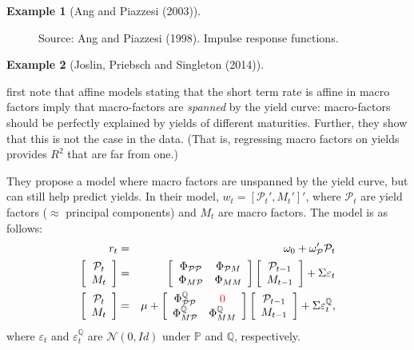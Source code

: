 \documentclass[
  12pt,
]{book}
\theoremstyle{definition}
\theoremstyle{definition}
\newtheorem{example}{Example}[chapter]
\theoremstyle{definition}
\theoremstyle{definition}
\theoremstyle{remark}
\begin{document}
\begin{example}[Ang and Piazzesi (2003)]
\begin{figure}
{}

\caption{Source: Ang and Piazzesi (1998). Impulse response functions.}\label{fig:figAngPiazzesi}
\end{figure}

\end{example}

\begin{example}[Joslin, Priebsch and Singleton (2014)]
\protect\hypertarget{exm:JPS}{}\label{exm:JPS}

\citet{Joslin_Priebsch_Singleton_2014} first note that affine models stating that the short term rate is affine in macro factors imply that macro-factors are \emph{spanned} by the yield curve: macro-factors should be perfectly explained by yields of different maturities. Further, they show that this is not the case in the data. (That is, regressing macro factors on yields provides \(R^2\) that are far from one.)

They propose a model where macro factors are unspanned by the yield curve, but can still help predict yields. In their model, \(w_t = [\mathcal{P}_t',M_t']'\), where \(\mathcal{P}_t\) are yield factors (\(\approx\) principal components) and \(M_t\) are macro factors. The model is as follows:
\begin{eqnarray*}
r_t &=& \omega_{0} + \omega_{\mathcal{P}}'\mathcal{P}_t \\
\left[\begin{array}{c}\mathcal{P}_t \\ M_t \end{array}\right]
&=&
\left[\begin{array}{cc}\Phi_{\mathcal{P}\mathcal{P}}&\Phi_{\mathcal{P}M} \\
\Phi_{M\mathcal{P}}&\Phi_{MM} \end{array}\right]
\left[\begin{array}{c}\mathcal{P}_{t-1} \\ M_{t-1} \end{array}\right] + \Sigma \varepsilon_t \\
\left[\begin{array}{c}\mathcal{P}_t \\ M_t \end{array}\right] &=& \mu +
\left[\begin{array}{cc}\Phi^{\mathbb{Q}}_{\mathcal{P}\mathcal{P}}&{\color{red}0} \\
\Phi^{\mathbb{Q}}_{M\mathcal{P}}&\Phi^{\mathbb{Q}}_{MM} \end{array}\right]
\left[\begin{array}{c}\mathcal{P}_{t-1} \\ M_{t-1} \end{array}\right] + \Sigma \varepsilon^{\mathbb{Q}}_t,
\end{eqnarray*}
where \(\varepsilon_t\) and \(\varepsilon^{\mathbb{Q}}_t\) are \(\mathcal{N}(0,Id)\) under \(\mathbb{P}\) and \(\mathbb{Q}\), respectively.


\end{example}
\end{document}
